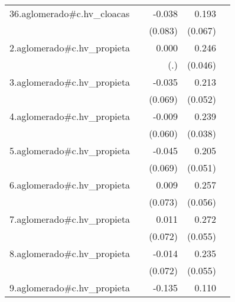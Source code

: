 {\begin{longtable}{l*{4}{D{.}{.}{-1}}}
\addlinespace
36.aglomerado#c.hv\_cloacas&                     &      -0.038         &       0.193\sym{**} &                     \\
            &                     &     (0.083)         &     (0.067)         &                     \\
\addlinespace
2.aglomerado#c.hv\_propieta&                     &       0.000         &       0.246\sym{***}&                     \\
            &                     &         (.)         &     (0.046)         &                     \\
\addlinespace
3.aglomerado#c.hv\_propieta&                     &      -0.035         &       0.213\sym{***}&                     \\
            &                     &     (0.069)         &     (0.052)         &                     \\
\addlinespace
4.aglomerado#c.hv\_propieta&                     &      -0.009         &       0.239\sym{***}&                     \\
            &                     &     (0.060)         &     (0.038)         &                     \\
\addlinespace
5.aglomerado#c.hv\_propieta&                     &      -0.045         &       0.205\sym{***}&                     \\
            &                     &     (0.069)         &     (0.051)         &                     \\
\addlinespace
6.aglomerado#c.hv\_propieta&                     &       0.009         &       0.257\sym{***}&                     \\
            &                     &     (0.073)         &     (0.056)         &                     \\
\addlinespace
7.aglomerado#c.hv\_propieta&                     &       0.011         &       0.272\sym{***}&                     \\
            &                     &     (0.072)         &     (0.055)         &                     \\
\addlinespace
8.aglomerado#c.hv\_propieta&                     &      -0.014         &       0.235\sym{***}&                     \\
            &                     &     (0.072)         &     (0.055)         &                     \\
\addlinespace
9.aglomerado#c.hv\_propieta&                     &      -0.135         &       0.110         &                     \\

\end{longtable}}

